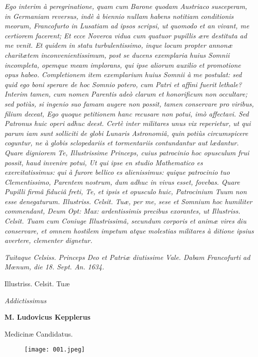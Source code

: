 \documentclass[a4paper, 11pt, oneside, polutonikogreek, german]{article}
\begin{document}
\emph{Ego interim à peregrinatione, quam cum Barone quodam Austriaco susceperam, in Germaniam reversus, indè à biennio nullam habens notitiam conditionis meorum, Francofurto in Lusatiam ad ipsos scripsi, ut quomodo et an vivant, me certiorem facerent; Et ecce Noverca vidua cum quatuor pupillis ære destituta ad me venit. Et quidem in statu turbulentissimo, inque locum propter annonæ charitætem inconvenientissimum, post se ducens exemplaria huius Somnii incompleta, opemque meam implorans, qui ipse aliorum auxilio et promotione opus habeo. Completionem item exemplarium huius Somnii à me postulat: sed quid ego boni sperare de hoc Somnio potero, cum Patri et affini fuerit lethale? Interim tamen, cum nomen Parentis adeò clarum et honorificum non occultare; sed potiùs, si ingenio suo famam augere non possit, tamen conservare pro viribus, filium deceat, Ego quoque petitionem hanc recusare non potui, imò affectavi. Sed Patronus huic operi adhuc deest. Certè inter militares unus vix reperietur, ut qui parum iam sunt solliciti de globi Lunaris Astronomiâ, quin potiùs circumspicere coguntur, ne à globis sclopedariis et tormentariis contundantur aut lædantur. Quare digniorem Te, Illustrissime Princeps, cuius patrocinio hoc opusculum frui possit, haud invenire potui, Ut qui ipse en studio Mathematico es exercitatissimus: qui à furore bellico es alienissimus: quique patrocinio tuo Clementissimo, Parentem nostrum, dum adhuc in vivus esset, fovebas. Quare Pupilli firmâ fiduciâ freti, Te, et ipsis et opusculo huic, Patrocinium Tuum non esse denegaturum. Illustriss. Celsit. Tuæ, per me, sese et Somnium hoc humiliter commendant, Deum Opt: Max: ardentissimis precibus exorantes, ut Illustriss. Celsit. Tuam cum Coniuge Illustrissimâ, secundum corporis et animæ vires diu conservare, et omnem hostilem impetum atque molestias militares à ditione ipsius avertere, clementer dignetur.}

\bigskip

\emph{Tuitaque Celsiss. Princeps Deo et Patriæ diutissime Vale. Dabam Francofurti ad Mœnum, die 18. Sept. An. 1634.}

\begin{center}
Illustriss. Celsit. Tuæ

\emph{Addictissimus}

\textbf{M. Ludovicus Kepplerus}

Medicinæ Candidatus.
\end{center}
\clearpage
\begin{figure}[H]
\centering
\texttt{[image: 001.jpeg]}
\end{figure}
\end{document}
